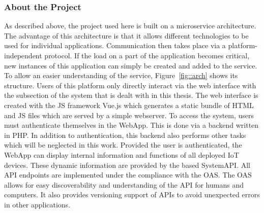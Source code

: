 \documentclass[12pt, a4paper]{article}
\begin{document}
        \subsubsection{About the Project}\label{ssec::project}
        
        As described above, the project used here is built on a microservice architecture. The advantage of this architecture is that it allows different technologies to be used for individual applications. Communication then takes place via a platform-independent protocol. If the load on a part of the application becomes critical, new instances of this application can simply be created and added to the service.\newline
        To allow an easier understanding of the service, Figure~\ref{fig::arch} shows its structure. Users of this platform only directly interact via the web interface with the subsection of the system that is dealt with in this thesis.
        The web interface is created with the \ac{JS} framework Vue.js which generates a static bundle of HTML and \ac{JS} files which are served by a simple webserver. To access the system, users must authenticate themselves in the WebApp. This is done via a backend written in PHP. In addition to authentication, this backend also performs other tasks which will be neglected in this work. Provided the user is authenticated, the WebApp can display internal information and functions of all deployed \ac{IoT} devices. These dynamic information are provided by the  based SystemAPI. All \ac{API} endpoints are implemented under the compliance with the \ac{OAS}. The \ac{OAS} allows for easy discoverability and understanding of the \ac{API} for humans and computers. It also provides versioning support of \ac{API}s to avoid unexpected errors in other applications. \newline
\end{document}
